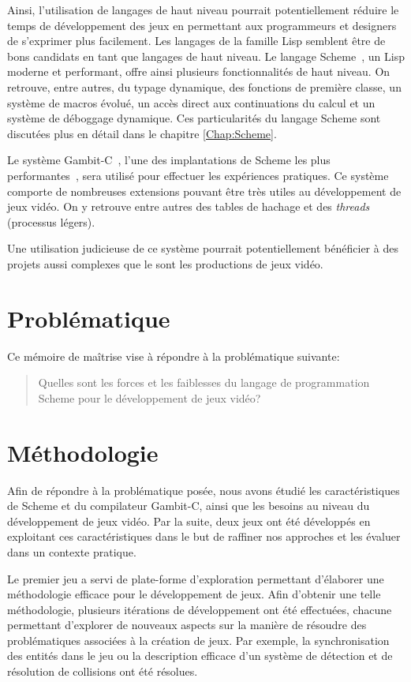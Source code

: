 \documentclass[12pt,twoside,letterpaper,francais]{book}
\begin{document}
Ainsi, l'utilisation de langages de haut niveau pourrait
potentiellement réduire le temps de dévelop\-pement des jeux en
permettant aux programmeurs et designers de s'exprimer plus
facilement. Les langages de la famille Lisp semblent être de bons
candidats en tant que langages de haut niveau. Le langage
Scheme~\cite{R5RS}, un Lisp moderne et performant, offre ainsi
plusieurs fonctionnalités de haut niveau. On retrouve, entre autres,
du typage dynamique, des fonctions de première classe, un système de
macros évolué, un accès direct aux continuations du calcul et un
système de déboggage dynamique. Ces particularités du langage Scheme
sont discutées plus en détail dans le chapitre \ref{Chap:Scheme}.

Le système Gambit-C~\cite{Gambit4}, l'une des implantations de
Scheme les plus performantes~\cite{GAMBIT_BENCHMARKS}, sera
utilisé pour effectuer les expériences pratiques. Ce système comporte
de nombreuses extensions pouvant être très utiles au dévelop\-pement de
jeux vidéo. On y retrouve entre autres des tables de hachage et des
\textit{threads} (processus légers).

Une utilisation judicieuse de ce système pourrait potentiellement
bénéficier à des projets aussi complexes que le sont les productions
de jeux vidéo.

\FloatBarrier
\section{Problématique}
Ce mémoire de maîtrise vise à répondre à la problématique suivante:
\begin{quote}
  Quelles sont les forces et les faiblesses du langage de
  programmation Scheme pour le dévelop\-pement de jeux vidéo?
\end{quote}

\FloatBarrier
\section{Méthodologie}
Afin de répondre à la problématique posée, nous avons étudié les
caractéristiques de Scheme et du compilateur Gambit-C, ainsi que les
besoins au niveau du dévelop\-pement de jeux vidéo. Par la suite, deux
jeux ont été développés en exploitant ces caractéristiques dans le but
de raffiner nos approches et les évaluer dans un contexte pratique.

Le premier jeu a servi de plate-forme d'exploration permettant
d'élaborer une méthodologie efficace pour le dévelop\-pement de
jeux. Afin d'obtenir une telle méthodologie, plusieurs itérations de
dévelop\-pement ont été effectuées, chacune permettant d'explorer de
nouveaux aspects sur la manière de résoudre des problématiques
associées à la création de jeux. Par exemple, la synchronisation des
entités dans le jeu ou la description efficace d'un système de
détection et de résolution de collisions ont été résolues.
\end{document}
